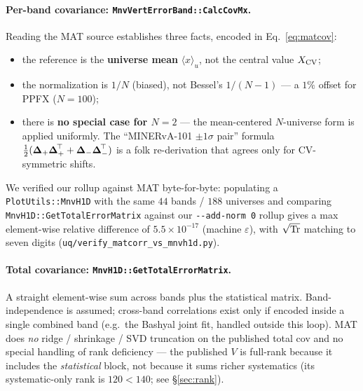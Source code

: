 \paragraph{Per-band covariance: \texttt{MnvVertErrorBand::CalcCovMx}.}
Reading the MAT source establishes three facts, encoded in
Eq.~\eqref{eq:matcov}:
\begin{itemize}[nosep]
  \item the reference is the \textbf{universe mean}
        $\langle x\rangle_{u}$, not the central value $X_{\text{CV}}$;
  \item the normalization is \textbf{$1/N$} (biased), not Bessel's
        $1/(N-1)$ --- a $1\%$ offset for PPFX ($N=100$);
  \item there is \textbf{no special case for $N=2$} --- the
        mean-centered $N$-universe form is applied uniformly. The
        ``MINERvA-101 $\pm1\sigma$ pair'' formula
        $\tfrac12(\boldsymbol{\Delta}_{+}\boldsymbol{\Delta}_{+}^{\!\top} +
        \boldsymbol{\Delta}_{-}\boldsymbol{\Delta}_{-}^{\!\top})$ is a folk
        re-derivation that agrees only for CV-symmetric shifts.
\end{itemize}
We verified our rollup against MAT byte-for-byte: populating a
\texttt{PlotUtils::MnvH1D} with the same $44$ bands / $188$ universes
and comparing \texttt{MnvH1D::GetTotalErrorMatrix} against our
\texttt{-{}-add-norm 0} rollup gives a max element-wise relative
difference of $5.5\times10^{-17}$ (machine $\varepsilon$), with
$\sqrt{\mathrm{Tr}}$ matching to seven digits
(\texttt{uq/verify\_matcorr\_vs\_mnvh1d.py}).

\paragraph{Total covariance: \texttt{MnvH1D::GetTotalErrorMatrix}.}
A straight element-wise sum across bands plus the statistical matrix.
Band-independence is assumed; cross-band correlations exist only if
encoded inside a single combined band (e.g.\ the Bashyal joint fit,
handled outside this loop). MAT does \emph{no} ridge / shrinkage / SVD
truncation on the published total cov and no special handling of rank
deficiency --- the published $V$ is full-rank because it includes the
\emph{statistical} block, not because it sums richer systematics (its
systematic-only rank is $120<140$; see \S\ref{sec:rank}).

